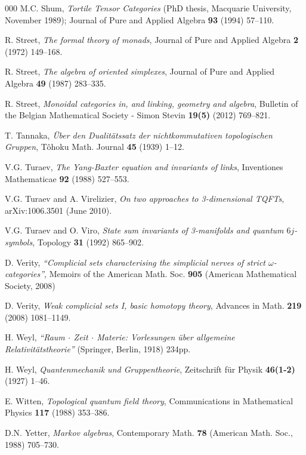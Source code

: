 \documentclass[a4paper,12pt]{article}
\theoremstyle{step}
\begin{document}
\begin{thebibliography}{000}
 M.C. Shum,
\textit{Tortile Tensor Categories} (PhD thesis, Macquarie University, November 1989); 
Journal of Pure and Applied Algebra \textbf{93} (1994) 57--110.

 R. Street,
\textit{The formal theory of monads}, 
Journal of Pure and Applied Algebra \textbf{2} (1972) 149--168.

 R. Street,
\textit{The algebra of oriented simplexes}, 
Journal of Pure and Applied Algebra \textbf{49} (1987) 283--335.

 R. Street,
\textit{Monoidal categories in, and linking, geometry and algebra}, 
Bulletin of the Belgian Mathematical Society - Simon Stevin \textbf{19(5)} (2012) 769--821.

 T. Tannaka,
\textit{ \"Uber den Dualit\"atssatz der nichtkommutativen topologischen Gruppen}, 
T\^ohoku Math. Journal \textbf{45} (1939) 1--12.

 V.G. Turaev, \textit{The Yang-Baxter equation and invariants of links}, Inventiones Mathematicae \textbf{92} (1988) 527--553.\label{Turaev1988}

 V.G. Turaev and A. Virelizier, \textit{On two approaches to 3-dimensional TQFTs}, arXiv:1006.3501 (June 2010).\label{TurVirel}

 V.G. Turaev and O. Viro, \textit{State sum invariants of 3-manifolds and quantum $6j$-symbols}, Topology \textbf{31} (1992) 865--902.\label{TuraevViro1992}

 D. Verity,
\textit{``Complicial sets characterising the simplicial nerves of strict $\omega$-categories''},
Memoirs of the American Math. Soc. \textbf{905} (American Mathematical Society, 2008)

 D. Verity,
\textit{Weak complicial sets I, basic homotopy theory},
Advances in Math. \textbf{219} (2008) 1081--1149.

 H. Weyl, 
\textit{``Raum$\ \cdot \ $Zeit$\ \cdot \ $Materie: Vorlesungen \"uber allgemeine Relativit\"atstheorie''}
(Springer, Berlin, 1918) 234pp.

 H. Weyl, 
\textit{Quantenmechanik und Gruppentheorie}, 
Zeitschrift f\"ur Physik \textbf{46(1-2)} (1927) 1--46.

 E. Witten, \textit{Topological quantum field theory}, 
Communications in Mathematical Physics \textbf{117} (1988) 353--386.\label{Wit}

 D.N. Yetter, \textit{Markov algebras}, 
Contemporary Math. \textbf{78} (American Math. Soc., 1988) 705--730.\label{Yetter1988}

\end{thebibliography}
\end{document}
